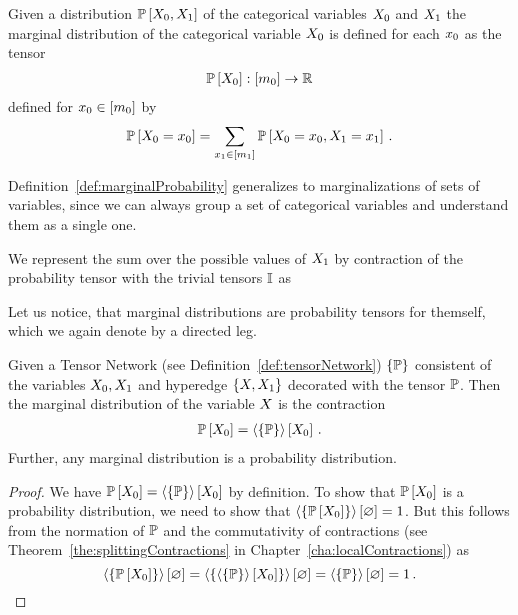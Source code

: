 \begin{definition}\label{def:marginalProbability}
	Given a distribution $\mathbb{P}\left[X_{0},X_{1}\right]$ of the categorical variables $X_{0}$ and $X_{1}$ the marginal distribution of the categorical variable $X_{0}$ is defined for each $x_{0}$ as the tensor
	\begin{align*}
		\mathbb{P}\left[X_{0}\right] : [m_{0}] \rightarrow \mathbb{R}
	\end{align*}
	defined for $x_{0}\in[m_{0}]$ by
	\begin{align*}
		\mathbb{P}\left[X_{0}=x_{0}\right] 
		= \sum_{x_{1}\in[m_{1}]} \mathbb{P}\left[X_{0}=x_{0},X_{1}=x_{1}\right] \, .
	\end{align*}
\end{definition}

Definition~\ref{def:marginalProbability} generalizes to marginalizations of sets of variables, since we can always group a set of categorical variables and understand them as a single one.

We represent the sum over the possible values of $X_{1}$ by contraction of the probability tensor with the trivial tensors $\mathbb{I}$ as 
\begin{center}
	
\end{center}
Let us notice, that marginal distributions are probability tensors for themself, which we again denote by a directed leg.

\begin{theorem}\label{the:marginalContraction}
	Given a Tensor Network (see Definition~\ref{def:tensorNetwork}) $\{\mathbb{P}\}$ consistent of the variables $X_{0},X_{1}$ and hyperedge $\{X,X_{1}\}$ decorated with the tensor $\mathbb{P}$.
	Then the marginal distribution of the variable $X$ is the contraction
	\begin{align*}
		\mathbb{P}\left[X_{0}\right] = \left\langle \{\mathbb{P}\}\right\rangle \left[ X_{0} \right] \, .
	\end{align*}
	Further, any marginal distribution is a probability distribution.
\end{theorem}
\begin{proof}
	We have $\mathbb{P}\left[X_{0}\right] = \left\langle \{\mathbb{P}\}\right\rangle \left[ X_{0} \right]$ by definition.
	To show that $\mathbb{P}\left[X_{0}\right]$ is a probability distribution, we need to show that $\left\langle \{\mathbb{P}\left[X_{0}\right]\}\right\rangle \left[ \varnothing \right]=1$.
	But this follows from the normation of $\mathbb{P}$ and the commutativity of contractions (see Theorem~\ref{the:splittingContractions} in Chapter~\ref{cha:localContractions}) as
		\[ \left\langle \{\mathbb{P}\left[X_{0}\right]\}\right\rangle \left[ \varnothing \right] = 
		\left\langle 
			\{ \left\langle \{\mathbb{P}\}\right\rangle \left[ X_{0} \right] \}
		\right\rangle \left[ \varnothing \right] =
		 \left\langle \{\mathbb{P}\}\right\rangle \left[ \varnothing \right]
		= 1 \, . 
		\]
\end{proof}




